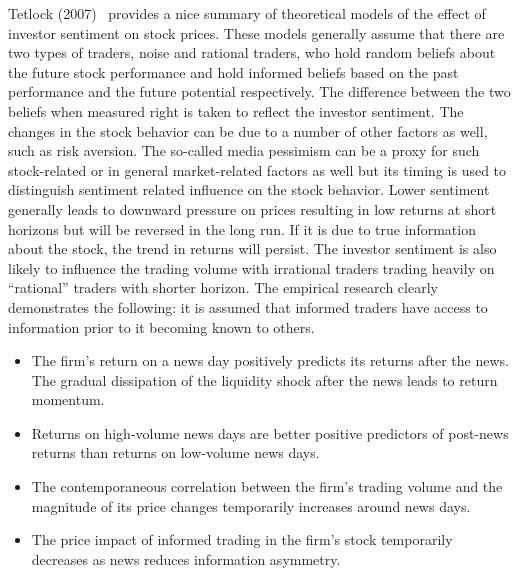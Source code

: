  
 Tetlock (2007)~\cite{tetlock2007giving} provides a nice summary of theoretical models of the effect of investor sentiment on stock prices. These models generally assume that there are two types of traders, noise and rational traders, who hold random beliefs about the future stock performance and hold informed beliefs based on the past performance and the future potential respectively. The difference between the two beliefs when measured right is taken to reflect the investor sentiment. The changes in the stock behavior can be due to a number of other factors as well, such as risk aversion. The so-called media pessimism can be a proxy for such stock-related or in general market-related factors as well but its timing is used to distinguish sentiment related influence on the stock behavior. Lower sentiment generally leads to downward pressure on prices resulting in low returns at short horizons but will be reversed in the long run. If it is due to true information about the stock, the trend in returns will persist. The investor sentiment is also likely to influence the trading volume with irrational traders trading heavily on ``rational'' traders with shorter horizon. The empirical research clearly demonstrates the following: it is assumed that informed traders have access to information prior to it becoming known to others.
 	\begin{itemize}
	\item The firm's return on a news day positively predicts its returns after the news. The gradual dissipation of the liquidity shock after the news leads to return momentum.
	\item Returns on high-volume news days are better positive predictors of post-news returns than returns on low-volume news days.
	\item The contemporaneous correlation between the firm's trading volume and the magnitude of its price changes temporarily increases around news days.
	\item The price impact of informed trading in the firm's stock temporarily decreases as news reduces information asymmetry. 
	\end{itemize}
 
